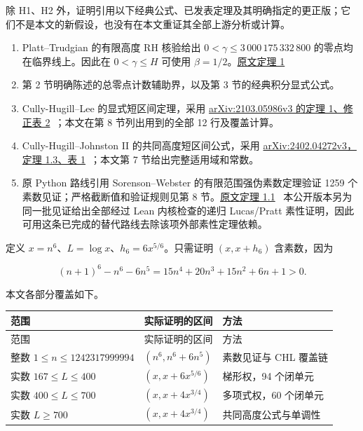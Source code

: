 \documentclass[UTF8,zihao=-4,fontset=fandol]{ctexart}
\begin{document}
除 H1、H2 外，证明引用以下经典公式、已发表定理及其明确指定的更正版；它们不是本文的新假设，也没有在本文重证其全部上游分析或计算。

\begin{enumerate}
\item Platt–Trudgian 的有限高度 RH 核验给出 \(0<\gamma\le3\,000\,175\,332\,800\) 的零点均在临界线上。因此在 \(0<\gamma\le H\) 可使用 \(\beta=1/2\)。\href{https://arxiv.org/abs/2004.09765}{原文定理 1}~\cite{PT}
\item 第 2 节明确陈述的总零点计数辅助界，以及第 3 节的经典积分显式公式。
\item Cully-Hugill–Lee 的显式短区间定理，采用 \href{https://arxiv.org/html/2103.05986v3}{arXiv:2103.05986v3 的定理 1、修正表 2}~\cite{CHL}；本文在第 8 节列出用到的全部 12 行及覆盖计算。
\item Cully-Hugill–Johnston II 的共同高度短区间公式，采用 \href{https://arxiv.org/html/2402.04272v3}{arXiv:2402.04272v3，定理 1.3、表 1}~\cite{CHJ}；本文第 7 节给出完整适用域和常数。
\item 原 Python 路线引用 Sorenson–Webster 的有限范围强伪素数定理验证 1259 个素数见证；严格截断值和验证规则见第 8 节。\href{https://arxiv.org/abs/1509.00864}{原文定理 1.1}~\cite{SW} 本公开版本另为同一批见证给出全部经过 Lean 内核检查的递归 Lucas/Pratt 素性证明，因此可用这条已完成的替代路线去除该项外部素性定理依赖。
\end{enumerate}

定义 \(x=n^6\)、\(L=\log x\)、\(h_6=6x^{5/6}\)。只需证明 \((x,x+h_6)\) 含素数，因为

\[
(n+1)^6-n^6-6n^5
=15n^4+20n^3+15n^2+6n+1>0. \tag{3}
\]

本文各部分覆盖如下。

\begingroup\small\setlength{\tabcolsep}{3pt}
\begin{longtable}{>{\raggedright\arraybackslash}p{}>{\raggedright\arraybackslash}p{}>{\raggedright\arraybackslash}p{}}
\toprule
范围 & 实际证明的区间 & 方法 \\
\midrule\endfirsthead
\toprule
范围 & 实际证明的区间 & 方法 \\
\midrule\endhead
\bottomrule\endfoot
整数 \(1\le n\le1242317999994\) & \((n^6,n^6+6n^5)\) & 素数见证与 CHL 覆盖链 \\
实数 \(167\le L\le400\) & \((x,x+6x^{5/6})\) & 梯形权，94 个闭单元 \\
实数 \(400\le L\le700\) & \((x,x+4x^{3/4})\) & 多项式权，60 个闭单元 \\
实数 \(L\ge700\) & \((x,x+4x^{3/4})\) & 共同高度公式与单调性 \\
\end{longtable}
\endgroup
\end{document}
